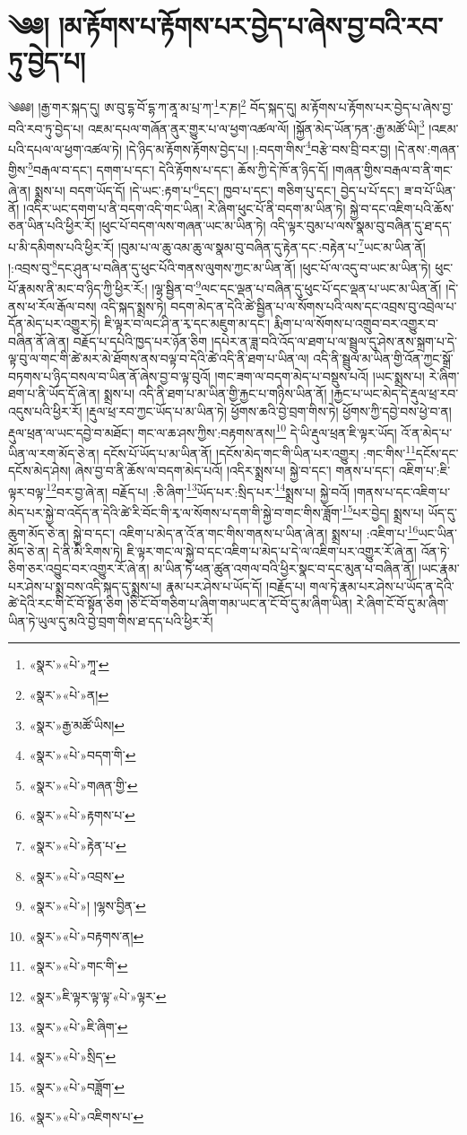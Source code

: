 \chapter{༄༅། །མ་རྟོགས་པ་རྟོགས་པར་བྱེད་པ་ཞེས་བྱ་བའི་རབ་ཏུ་བྱེད་པ།}༄༅༅། །རྒྱ་གར་སྐད་དུ། ཨ་བུ་དྷ་བོ་དྷ་ཀ་ནཱ་མ་པྲ་ཀ་\footnote{«སྣར་»«པེ་»ཀཱ་}ར་ཎ།\footnote{«སྣར་»«པེ་»ན།} བོད་སྐད་དུ། མ་རྟོགས་པ་རྟོགས་པར་བྱེད་པ་ཞེས་བྱ་བའི་རབ་ཏུ་བྱེད་པ། འཇམ་དཔལ་གཞོན་ནུར་གྱུར་པ་ལ་ཕྱག་འཚལ་ལོ། །སྐྱོན་མེད་ཡོན་ཏན་:རྒྱ་མཚོ་ཡི།\footnote{«སྣར་»རྒྱ་མཚོ་ཡིས།} །འཇམ་པའི་དཔལ་ལ་ཕྱག་འཚལ་ཏེ། །དེ་ཉིད་མ་རྟོགས་རྟོགས་བྱེད་པ། །:བདག་གིས་\footnote{«སྣར་»«པེ་»བདག་གི་}བརྩེ་བས་བྲི་བར་བྱ། །དེ་ནས་:གཞན་གྱིས་\footnote{«སྣར་»«པེ་»གཞན་གྱི་}བརྒལ་བ་དང་། དགག་པ་དང་། དེའི་རྟོགས་པ་དང་། ཆོས་ཀྱི་དེ་ཁོ་ན་ཉིད་དོ། །གཞན་གྱིས་བརྒལ་བ་ནི་གང་ཞེ་ན། སྨྲས་པ། བདག་ཡོད་དོ། །དེ་ཡང་:རྟག་པ་\footnote{«སྣར་»«པེ་»རྟགས་པ་}དང་། ཁྱབ་པ་དང་། གཅིག་པུ་དང་། བྱེད་པ་པོ་དང་། ཟ་བ་པོ་ཡིན་ནོ། །འདིར་ཡང་དགག་པ་ནི་བདག་འདི་གང་ཡིན། རེ་ཞིག་ཕུང་པོ་ནི་བདག་མ་ཡིན་ཏེ། སྐྱེ་བ་དང་འཇིག་པའི་ཆོས་ཅན་ཡིན་པའི་ཕྱིར་རོ། །ཕུང་པོ་བདག་ལས་གཞན་ཡང་མ་ཡིན་ཏེ། འདི་ལྟར་བུམ་པ་ལས་སྣམ་བུ་བཞིན་དུ་ཐ་དད་པ་མི་དམིགས་པའི་ཕྱིར་རོ། །བུམ་པ་ལ་ཆུ་འམ་ཆུ་ལ་སྣམ་བུ་བཞིན་དུ་རྟེན་དང་:བརྟེན་པ་\footnote{«སྣར་»«པེ་»རྟེན་པ་}ཡང་མ་ཡིན་ནོ། །:འབྲས་བུ་\footnote{«སྣར་»«པེ་»འབྲས་}དང་ཤུན་པ་བཞིན་དུ་ཕུང་པོའི་གནས་ལུགས་ཀྱང་མ་ཡིན་ནོ། །ཕུང་པོ་ལ་འདུ་བ་ཡང་མ་ཡིན་ཏེ། ཕུང་པོ་རྣམས་ནི་མང་བ་ཉིད་ཀྱི་ཕྱིར་རོ:། །ལྷ་སྦྱིན་བ་\footnote{«སྣར་»«པེ་»། །ལྷས་བྱིན་}ལང་དང་ལྡན་པ་བཞིན་དུ་ཕུང་པོ་དང་ལྡན་པ་ཡང་མ་ཡིན་ནོ། །དེ་ནས་ཕ་རོལ་རྒོལ་བས། འདི་སྐད་སྨྲས་ཏེ། བདག་མེད་ན་དེའི་ཚེ་སྦྱིན་པ་ལ་སོགས་པའི་ལས་དང་འབྲས་བུ་འབྲེལ་པ་དོན་མེད་པར་འགྱུར་ཏེ། ཇི་ལྟར་བ་ལང་ཤི་ན་རྭ་དང་མཇུག་མ་དང་། རྨིག་པ་ལ་སོགས་པ་འགྲུབ་བར་འགྱུར་བ་བཞིན་ནོ་ཞེ་ན། བརྗོད་པ་དཔེའི་ཁྱད་པར་ཉོན་ཅིག །དཔེར་ན་ཟླ་བའི་འོད་ལ་ཐག་པ་ལ་སྦྲུལ་དུ་ཤེས་ནས་སྐྲག་པ་དེ་ལྟ་བུ་ལ་གང་གི་ཚེ་མར་མེ་ཐོགས་ནས་བལྟ་བ་དེའི་ཚེ་འདི་ནི་ཐག་པ་ཡིན་ལ། འདི་ནི་སྦྲུལ་མ་ཡིན་གྱི་འོན་ཀྱང་སྒྲོ་བཏགས་པ་ཉིད་བསལ་བ་ཡིན་ནོ་ཞེས་བྱ་བ་ལྟ་བུའོ། །གང་ཟག་ལ་བདག་མེད་པ་བསྡུས་པའོ། །ཡང་སྨྲས་པ། རེ་ཞིག་ཐག་པ་ནི་ཡོད་དོ་ཞེ་ན། སྨྲས་པ། འདི་ནི་ཐག་པ་མ་ཡིན་གྱི་རྐྱང་པ་གཉིས་ཡིན་ནོ། །རྐྱང་པ་ཡང་མེད་དེ་རྡུལ་ཕྲ་རབ་འདུས་པའི་ཕྱིར་རོ། །རྡུལ་ཕྲ་རབ་ཀྱང་ཡོད་པ་མ་ཡིན་ཏེ། ཕྱོགས་ཆའི་བྱེ་བྲག་གིས་ཏེ། ཕྱོགས་ཀྱི་དབྱེ་བས་ཕྱེ་བ་ན། རྡུལ་ཕྲན་ལ་ཡང་དབྱེ་བ་མཐོང་། གང་ལ་ཆ་ཤས་ཀྱིས་:བརྟགས་ནས།\footnote{«སྣར་»«པེ་»བརྟགས་ན།} དེ་ཡི་རྡུལ་ཕྲན་ཇི་ལྟར་ཡོད། འོ་ན་མེད་པ་ཡིན་ལ་རག་མོད་ཅེ་ན། དངོས་པོ་ཡོད་པ་མ་ཡིན་ནོ། །དངོས་མེད་གང་གི་ཡིན་པར་འགྱུར། :གང་གིས་\footnote{«སྣར་»«པེ་»གང་གི་}དངོས་དང་དངོས་མེད་ཤེས། ཞེས་བྱ་བ་ནི་ཆོས་ལ་བདག་མེད་པའོ། །འདིར་སྨྲས་པ། སྐྱེ་བ་དང་། གནས་པ་དང་། འཇིག་པ་:ཇི་ལྟར་བལྟ་\footnote{«སྣར་»ཇི་ལྟར་ལྟ་ལྟ་«པེ་»ལྟར་}བར་བྱ་ཞེ་ན། བརྗོད་པ། :ཅི་ཞིག་\footnote{«སྣར་»«པེ་»ཇི་ཞིག་}ཡོད་པར་:སྲིད་པར་\footnote{«སྣར་»«པེ་»སྲིད་}སྨྲས་པ། སྐྱེ་བའོ། །གནས་པ་དང་འཇིག་པ་མེད་པར་སྐྱེ་བ་འདོད་ན་དེའི་ཚེ་རི་བོང་གི་རྭ་ལ་སོགས་པ་དག་གི་སྐྱེ་བ་གང་གིས་ཟློག་\footnote{«སྣར་»«པེ་»བཟློག་}པར་བྱེད། སྨྲས་པ། ཡོད་དུ་ཆུག་མོད་ཅེ་ན། སྐྱེ་བ་དང་། འཇིག་པ་མེད་ན་འོ་ན་གང་གིས་གནས་པ་ཡིན་ཞེ་ན། སྨྲས་པ། :འཇིག་པ་\footnote{«སྣར་»«པེ་»འཇིགས་པ་}ཡང་ཡིན་མོད་ཅེ་ན། དེ་ནི་མི་རིགས་ཏེ། ཇི་ལྟར་གང་ལ་སྐྱེ་བ་དང་འཇིག་པ་མེད་པ་དེ་ལ་འཇིག་པར་འགྱུར་རོ་ཞེ་ན། འོན་ཏེ་ཅིག་ཅར་འབྱུང་བར་འགྱུར་རོ་ཞེ་ན། མ་ཡིན་ཏེ་ཕན་ཚུན་འགལ་བའི་ཕྱིར་སྣང་བ་དང་མུན་པ་བཞིན་ནོ། །ཡང་རྣམ་པར་ཤེས་པ་སྨྲ་བས་འདི་སྐད་དུ་སྨྲས་པ། རྣམ་པར་ཤེས་པ་ཡོད་དོ། །བརྗོད་པ། གལ་ཏེ་རྣམ་པར་ཤེས་པ་ཡོད་ན་དེའི་ཚེ་དེའི་རང་གི་ངོ་བོ་སྟོན་ཅིག །ཅི་ངོ་བོ་གཅིག་པ་ཞིག་གམ་ཡང་ན་ངོ་བོ་དུ་མ་ཞིག་ཡིན། རེ་ཞིག་ངོ་བོ་དུ་མ་ཞིག་ཡིན་ཏེ་ཡུལ་དུ་མའི་བྱེ་བྲག་གིས་ཐ་དད་པའི་ཕྱིར་རོ། 
